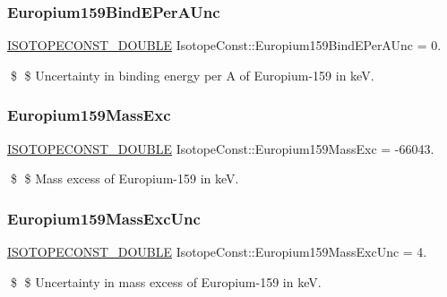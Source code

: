 \subsubsection{\texorpdfstring{Europium159\+Bind\+E\+Per\+A\+Unc}{Europium159BindEPerAUnc}}
{\footnotesize\ttfamily \mbox{\hyperlink{group___isotope_const-_macros_ga8f45a7272ce02c0b4c65c44636ed719a}{I\+S\+O\+T\+O\+P\+E\+C\+O\+N\+S\+T\+\_\+\+D\+O\+U\+B\+LE}} Isotope\+Const\+::\+Europium159\+Bind\+E\+Per\+A\+Unc = 0.}

\$ \$ Uncertainty in binding energy per A of Europium-\/159 in keV. \mbox{\label{group___isotope_const-_europium-_eu159_gaebd86e7e3a008727a84cf15f71d3038f}} 
\subsubsection{\texorpdfstring{Europium159\+Mass\+Exc}{Europium159MassExc}}
{\footnotesize\ttfamily \mbox{\hyperlink{group___isotope_const-_macros_ga8f45a7272ce02c0b4c65c44636ed719a}{I\+S\+O\+T\+O\+P\+E\+C\+O\+N\+S\+T\+\_\+\+D\+O\+U\+B\+LE}} Isotope\+Const\+::\+Europium159\+Mass\+Exc = -\/66043.}

\$ \$ Mass excess of Europium-\/159 in keV. \mbox{\label{group___isotope_const-_europium-_eu159_ga0d0d17de953115383791926d30750661}} 
\subsubsection{\texorpdfstring{Europium159\+Mass\+Exc\+Unc}{Europium159MassExcUnc}}
{\footnotesize\ttfamily \mbox{\hyperlink{group___isotope_const-_macros_ga8f45a7272ce02c0b4c65c44636ed719a}{I\+S\+O\+T\+O\+P\+E\+C\+O\+N\+S\+T\+\_\+\+D\+O\+U\+B\+LE}} Isotope\+Const\+::\+Europium159\+Mass\+Exc\+Unc = 4.}

\$ \$ Uncertainty in mass excess of Europium-\/159 in keV. \mbox{\label{group___isotope_const-_europium-_eu159_gafe8c437ff932a9de6984aa33a2a8541a}} 
